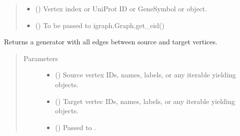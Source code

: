 \documentclass[letterpaper,10pt,english]{sphinxmanual}
\begin{document}
\begin{fulllineitems}
\begin{fulllineitems}
\begin{quote}
\begin{description}
\begin{itemize}
\item {} 
 (\sphinxstyleliteralemphasis{\sphinxupquote{,}}) \textendash{} Vertex index or UniProt ID or GeneSymbol or 
object.

\item {} 
 () \textendash{} To be passed to igraph.Graph.get\_eid()

\end{itemize}

\end{description}\end{quote}

\end{fulllineitems}


\begin{fulllineitems}
\label{\detokenize{main:pypath.main.PyPath.get_edges}}
Returns a generator with all edges between source and target vertices.
\begin{quote}\begin{description}
\item[{Parameters}] \leavevmode\begin{itemize}
\item {} 
 () \textendash{} Source vertex IDs, names, labels, or any iterable yielding
 objects.

\item {} 
 () \textendash{} Target vertec IDs, names, labels, or any iterable yielding
 objects.

\item {} 
 () \textendash{} Passed to .

\end{itemize}


\end{description}
\end{quote}
\end{fulllineitems}
\end{fulllineitems}
\end{document}
